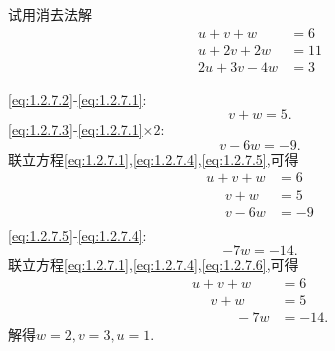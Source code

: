 ﻿\documentclass{book} \usepackage{exsheets} \usepackage{xeCJK}
\begin{document}
\begin{question}
  试用消去法解
  \begin{align}
u+v+w&=6   \tag{1}\label{eq:1.2.7.1}\\
u+2v+2w&=11\tag{2}\label{eq:1.2.7.2}\\
2u+3v-4w&=3\tag{3}\label{eq:1.2.7.3}
  \end{align}
\end{question}
\begin{solution}
  \eqref{eq:1.2.7.2}-\eqref{eq:1.2.7.1}:
  \begin{equation}
    \label{eq:1.2.7.4}
    \tag{4}
v+w=5.
  \end{equation}
\eqref{eq:1.2.7.3}-\eqref{eq:1.2.7.1}$\times 2$:
\begin{equation}
  \label{eq:1.2.7.5}\tag{5}
  v-6w=-9.
\end{equation}
联立方程\eqref{eq:1.2.7.1},\eqref{eq:1.2.7.4},\eqref{eq:1.2.7.5},可得
\begin{align*}
  u+v+w&=6\\
~~~~~~v+w&=5\\
~~~~~~v-6w&=-9\\
\end{align*}
\eqref{eq:1.2.7.5}-\eqref{eq:1.2.7.4}:
\begin{equation}\label{eq:1.2.7.6}\tag{6}
  -7w=-14.
\end{equation}
联立方程\eqref{eq:1.2.7.1},\eqref{eq:1.2.7.4},\eqref{eq:1.2.7.6},可得
\begin{align*}
  u+v+w&=6\\
~~~~~~v+w&=5\\
~~~~~~~~~~~~~~-7w&=-14.
\end{align*}
解得$w=2,v=3,u=1$.
\end{solution}
\end{document}
